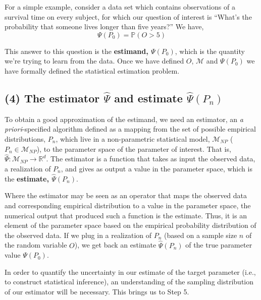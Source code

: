\documentclass[12pt, krantz2,]{book}
\theoremstyle{definition}
\theoremstyle{definition}
\theoremstyle{definition}
\newcommand{\1}{\mathbbm{1}}
\begin{document}
For a simple example, consider a data set which contains observations of a
survival time on every subject, for which our question of interest is ``What's
the probability that someone lives longer than five years?'' We have,
\begin{equation*}
  \Psi(P_0) = \mathbb{P}(O > 5)
\end{equation*}

This answer to this question is the \textbf{estimand, \(\Psi(P_0)\)}, which is the
quantity we're trying to learn from the data. Once we have defined \(O\),
\(\mathcal{M}\) and \(\Psi(P_0)\) we have formally defined the statistical
estimation problem.

\hypertarget{the-estimator-hatpsi-and-estimate-hatpsip_n}{%
\subsection*{\texorpdfstring{(4) The estimator \(\hat{\Psi}\) and estimate \(\hat{\Psi}(P_n)\)}{(4) The estimator \textbackslash{}hat\{\textbackslash{}Psi\} and estimate \textbackslash{}hat\{\textbackslash{}Psi\}(P\_n)}}\label{the-estimator-hatpsi-and-estimate-hatpsip_n}}


To obtain a good approximation of the estimand, we need an estimator, an \emph{a
priori}-specified algorithm defined as a mapping from the set of possible
empirical distributions, \(P_n\), which live in a non-parametric statistical
model, \(\mathcal{M}_{NP}\) (\(P_n \in \mathcal{M}_{NP}\)), to the parameter space
of the parameter of interest. That is, \(\hat{\Psi} : \mathcal{M}_{NP} \rightarrow \mathbb{R}^d\). The estimator is a function that takes as input
the observed data, a realization of \(P_n\), and gives as output a value in the
parameter space, which is the \textbf{estimate, \(\hat{\Psi}(P_n)\)}.

Where the estimator may be seen as an operator that maps the observed data and
corresponding empirical distribution to a value in the parameter space, the
numerical output that produced such a function is the estimate. Thus, it is an
element of the parameter space based on the empirical probability distribution
of the observed data. If we plug in a realization of \(P_n\) (based on a sample
size \(n\) of the random variable \(O\)), we get back an estimate \(\hat{\Psi}(P_n)\)
of the true parameter value \(\Psi(P_0)\).

In order to quantify the uncertainty in our estimate of the target parameter
(i.e., to construct statistical inference), an understanding of the sampling
distribution of our estimator will be necessary. This brings us to Step 5.
\end{document}
